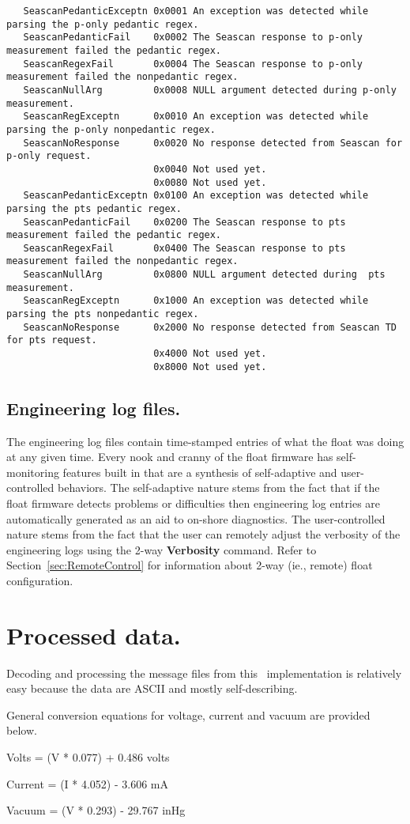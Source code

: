    \label{SbeStatusBitMasks}
   \begin{verbatim}
   SeascanPedanticExceptn 0x0001 An exception was detected while parsing the p-only pedantic regex.
   SeascanPedanticFail    0x0002 The Seascan response to p-only measurement failed the pedantic regex.
   SeascanRegexFail       0x0004 The Seascan response to p-only measurement failed the nonpedantic regex.
   SeascanNullArg         0x0008 NULL argument detected during p-only measurement.
   SeascanRegExceptn      0x0010 An exception was detected while parsing the p-only nonpedantic regex.
   SeascanNoResponse      0x0020 No response detected from Seascan for p-only request.
                          0x0040 Not used yet.
                          0x0080 Not used yet.
   SeascanPedanticExceptn 0x0100 An exception was detected while parsing the pts pedantic regex.
   SeascanPedanticFail    0x0200 The Seascan response to pts measurement failed the pedantic regex.
   SeascanRegexFail       0x0400 The Seascan response to pts measurement failed the nonpedantic regex.
   SeascanNullArg         0x0800 NULL argument detected during  pts measurement.
   SeascanRegExceptn      0x1000 An exception was detected while parsing the pts nonpedantic regex.
   SeascanNoResponse      0x2000 No response detected from Seascan TD for pts request.
                          0x4000 Not used yet.
                          0x8000 Not used yet.
   \end{verbatim} 

\subsection{Engineering log files.}

The engineering log files contain time-stamped entries of what the float was
doing at any given time.  Every nook and cranny of the float firmware has
self-monitoring features built in that are a synthesis of self-adaptive and
user-controlled behaviors.  The self-adaptive nature stems from the fact
that if the float firmware detects problems or difficulties then engineering
log entries are automatically generated as an aid to on-shore diagnostics.
The user-controlled nature stems from the fact that the user can remotely
adjust the verbosity of the engineering logs using the 2-way
\textbf{Verbosity} command.  Refer to Section~\ref{sec:RemoteControl} for
information about 2-way (ie., remote) float configuration.

\section{Processed data.}
\label{sec:ProcessedData}

Decoding and processing the message files from this \iridium\ implementation
is relatively easy because the data are ASCII and mostly self-describing.

General conversion equations for voltage, current and vacuum are provided below.

Volts = (V * 0.077) + 0.486 volts

Current = (I * 4.052) - 3.606 mA

Vacuum = (V * 0.293) - 29.767 inHg
  


